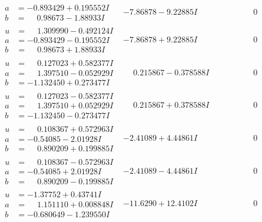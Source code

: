 \documentclass[1p]{elsarticle_modified}
\theoremstyle{definition}
\begin{document}
$$\begin{array}{c|c|c}
\begin{aligned}
a &= -0.893429 + 0.195552 I \\
b &= \phantom{-}0.98673 - 1.88933 I\end{aligned}
 & -7.86878 - 9.22885 I & \phantom{-0.000000 } 0 \\ \hline\begin{aligned}
u &= \phantom{-}1.309990 - 0.492124 I \\
a &= -0.893429 - 0.195552 I \\
b &= \phantom{-}0.98673 + 1.88933 I\end{aligned}
 & -7.86878 + 9.22885 I & \phantom{-0.000000 } 0 \\ \hline\begin{aligned}
u &= \phantom{-}0.127023 + 0.582377 I \\
a &= \phantom{-}1.397510 - 0.052929 I \\
b &= -1.132450 + 0.273477 I\end{aligned}
 & \phantom{-}0.215867 - 0.378588 I & \phantom{-0.000000 } 0 \\ \hline\begin{aligned}
u &= \phantom{-}0.127023 - 0.582377 I \\
a &= \phantom{-}1.397510 + 0.052929 I \\
b &= -1.132450 - 0.273477 I\end{aligned}
 & \phantom{-}0.215867 + 0.378588 I & \phantom{-0.000000 } 0 \\ \hline\begin{aligned}
u &= \phantom{-}0.108367 + 0.572963 I \\
a &= -0.54085 - 2.01928 I \\
b &= \phantom{-}0.890209 + 0.199885 I\end{aligned}
 & -2.41089 + 4.44861 I & \phantom{-0.000000 } 0 \\ \hline\begin{aligned}
u &= \phantom{-}0.108367 - 0.572963 I \\
a &= -0.54085 + 2.01928 I \\
b &= \phantom{-}0.890209 - 0.199885 I\end{aligned}
 & -2.41089 - 4.44861 I & \phantom{-0.000000 } 0 \\ \hline\begin{aligned}
u &= -1.37752 + 0.43741 I \\
a &= \phantom{-}1.151110 + 0.008848 I \\
b &= -0.680649 - 1.239550 I\end{aligned}
 & -11.6290 + 12.4102 I & \phantom{-0.000000 } 0\\

\end{array}$$
\end{document}
